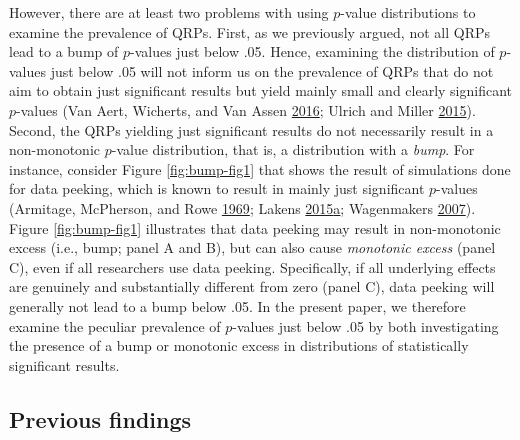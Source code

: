\documentclass[a5paper]{book}
\begin{document}
However, there are at least two problems with using \(p\)-value
distributions to examine the prevalence of QRPs. First, as we previously
argued, not all QRPs lead to a bump of \(p\)-values just below .05.
Hence, examining the distribution of \(p\)-values just below .05 will
not inform us on the prevalence of QRPs that do not aim to obtain just
significant results but yield mainly small and clearly significant
\(p\)-values (Van Aert, Wicherts, and Van Assen
\protect\hyperlink{ref-doi:10.1177ux2f1745691616650874}{2016}; Ulrich
and Miller \protect\hyperlink{ref-doi:10.1037ux2fxge0000086}{2015}).
Second, the QRPs yielding just significant results do not necessarily
result in a non-monotonic \(p\)-value distribution, that is, a
distribution with a \emph{bump}. For instance, consider Figure
\ref{fig:bump-fig1} that shows the result of simulations done for data
peeking, which is known to result in mainly just significant
\(p\)-values (Armitage, McPherson, and Rowe
\protect\hyperlink{ref-doi:10.2307ux2f2343787}{1969}; Lakens
\protect\hyperlink{ref-doi:10.1080ux2f17470218.2014.982664}{2015}\protect\hyperlink{ref-doi:10.1080ux2f17470218.2014.982664}{a};
Wagenmakers \protect\hyperlink{ref-doi:10.3758ux2fbf03194105}{2007}).
Figure \ref{fig:bump-fig1} illustrates that data peeking may result in
non-monotonic excess (i.e., bump; panel A and B), but can also cause
\emph{monotonic excess} (panel C), even if all researchers use data
peeking. Specifically, if all underlying effects are genuinely and
substantially different from zero (panel C), data peeking will generally
not lead to a bump below .05. In the present paper, we therefore examine
the peculiar prevalence of \(p\)-values just below .05 by both
investigating the presence of a bump or monotonic excess in
distributions of statistically significant results.

\subsection{Previous findings}\label{previous-findings}
\end{document}

